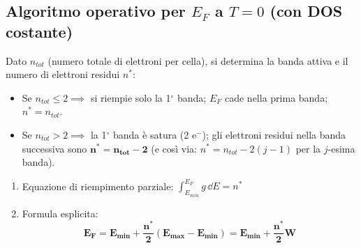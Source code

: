 \subsection{Algoritmo operativo per $E_F$ a $T=0$ (con DOS costante)}
Dato $n_{tot}$ (numero totale di elettroni per cella), si determina la banda attiva e il numero di elettroni residui $n^*$:
\begin{itemize}
    \setlength{\itemsep}{1pt}
    \item Se $n_{tot}\le 2 \implies$ si riempie solo la 1$^\circ$ banda; $E_F$ cade nella prima banda; $n^*=n_{tot}$.
    \item Se $n_{tot}>2 \implies$ la 1$^\circ$ banda è satura (2 e$^-$); gli elettroni residui nella banda successiva sono $\bm{n^*=n_{tot}-2}$ (e così via: $n^* = n_{tot}-2(j-1)$ per la $j$-esima banda).
\end{itemize}
\begin{enumerate}
    \item Equazione di riempimento parziale: $\displaystyle\int_{E_{min}}^{E_F} g\,\dd E = n^*$
    \item Formula esplicita:
    \[ \bm{E_F = E_{min} + \frac{n^*}{2}\left(E_{max}-E_{min}\right) = E_{min} + \frac{n^*}{2}W} \]
\end{enumerate}


